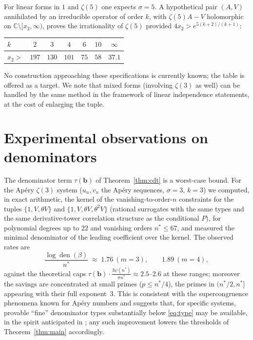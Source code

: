 \documentclass[11pt]{amsart}
\theoremstyle{definition}
\theoremstyle{remark}
\newcommand{\C}{\mathbb{C}}
\begin{document}
For linear forms in $1$ and $\zeta(5)$ one expects $\sigma=5$. A
hypothetical pair $(A,V)$ annihilated by an irreducible operator of
order $k$, with $\zeta(5)A-V$ holomorphic on
$\C\setminus[x_2,\infty)$, proves the irrationality of $\zeta(5)$
provided $4x_2>e^{5(k+2)/(k+1)}$:
\begin{center}
\begin{tabular}{lcccccc}
\toprule
$k$ & $2$ & $3$ & $4$ & $6$ & $10$ & $\infty$\\
\midrule
$x_2>$ & $197$ & $130$ & $101$ & $75$ & $58$ & $37.1$\\
\bottomrule
\end{tabular}
\end{center}
No construction approaching these specifications is currently known;
the table is offered as a target. We note that mixed forms (involving
$\zeta(3)$ as well) can be handled by the same method in the framework
of linear independence statements, at the cost of enlarging the tuple.

\section{Experimental observations on denominators}\label{sec:exp}

The denominator term $\tau(\mathbf b)$ of Theorem~\ref{thm:cdt} is a
worst-case bound. For the Ap\'ery $\zeta(3)$ system
($u_n,v_n$ the Ap\'ery sequences, $\sigma=3$, $k=3$) we computed, in
exact arithmetic, the kernel of the vanishing-to-order-$n$ constraints
for the tuples $\{1,V,\theta V\}$ and $\{1,V,\theta V,\theta^2V\}$
(rational surrogates with the same types and the same
derivative-tower correlation structure as the conditional $P$), for
polynomial degrees up to $22$ and vanishing orders $n^*\le 67$, and
measured the minimal denominator of the leading coefficient over the
kernel. The observed rates are
\[
\frac{\log\operatorname{den}(\beta)}{n^*}\;\approx\;1.76\ (m=3),
\qquad 1.89\ (m=4),
\]
against the theoretical caps
$\tau(\mathbf b)\cdot\frac{3\psi(n^*)}{\sigma n^*}\approx 2.5$--$2.6$
at these ranges; moreover the savings are concentrated at small primes
($p\le n^*/4$), the primes in $(n^*/2,n^*]$ appearing with their full
exponent~$3$. This is consistent with the supercongruence phenomena
known for Ap\'ery numbers and suggests that, for specific systems,
provable ``fine'' denominator types substantially below
\eqref{eq:type} may be available, in the spirit anticipated in
\cite[Remarks~6.6.15 and~10.2.3]{CDT}; any such improvement lowers the
thresholds of Theorem~\ref{thm:main} accordingly.
\end{document}
